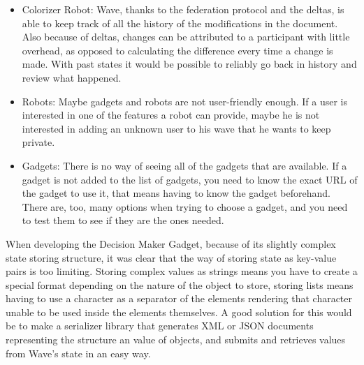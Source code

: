 \begin{itemize}
  \item Colorizer Robot: Wave, thanks to the federation protocol and the deltas, is able to keep track of all the history of the modifications in the document. Also because of deltas, changes can be attributed to a participant with little overhead, as opposed to calculating the difference every time a change is made. With past states it would be possible to reliably go back in history and review what happened.
  \item Robots: Maybe gadgets and robots are not user-friendly enough. If a user is interested in one of the features a robot can provide, maybe he is not interested in adding an unknown user to his wave that he wants to keep private.
  \item Gadgets: There is no way of seeing all of the gadgets that are available. If a gadget is not added to the list of gadgets, you need to know the exact URL of the gadget to use it, that means having to know the gadget beforehand. There are, too, many options when trying to choose a gadget, and you need to test them to see if they are the ones needed.
\end{itemize}
When developing the Decision Maker Gadget, because of its slightly complex state storing structure, it was clear that the way of storing state as key-value pairs is too limiting. Storing complex values as strings means you have to create a special format depending on the nature of the object to store, storing lists means having to use a character as a separator of the elements rendering that character unable to be used inside the elements themselves. A good solution for this would be to make a serializer library that generates XML or JSON documents representing the structure an value of objects, and submits and retrieves values from Wave's state in an easy way.

\newpage
{}

